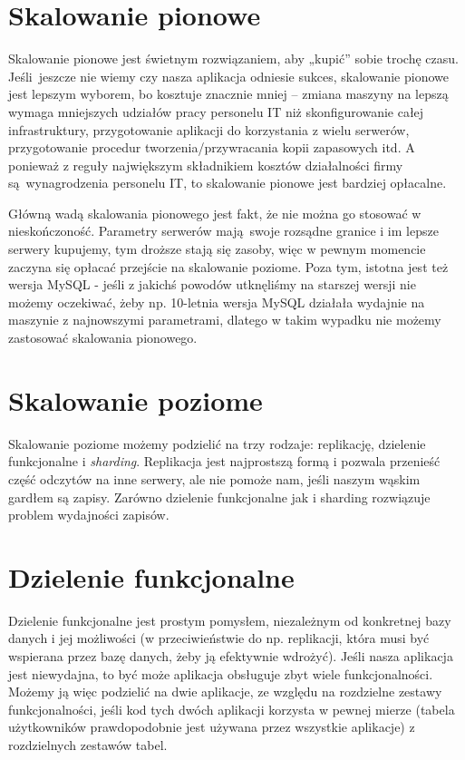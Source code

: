 \documentclass[a4paper,12pt]{article}
\begin{document}
\section{Skalowanie pionowe}

Skalowanie pionowe jest świetnym rozwiązaniem, aby „kupić” sobie trochę czasu. Jeśli~jeszcze nie wiemy czy nasza aplikacja odniesie sukces, skalowanie pionowe jest lepszym wyborem, bo kosztuje znacznie mniej – zmiana maszyny na lepszą wymaga mniejszych udziałów pracy personelu IT niż skonfigurowanie całej infrastruktury, przygotowanie aplikacji do korzystania z wielu serwerów, przygotowanie procedur tworzenia/przywracania kopii zapasowych itd. A ponieważ z reguły największym składnikiem kosztów działalności firmy są wynagrodzenia personelu IT, to skalowanie pionowe jest bardziej opłacalne.

Główną wadą skalowania pionowego jest fakt, że nie można go stosować w nieskończoność. Parametry serwerów mają swoje rozsądne granice i im lepsze serwery kupujemy, tym droższe stają się zasoby, więc w pewnym momencie zaczyna się opłacać przejście na skalowanie poziome. Poza tym, istotna jest też wersja MySQL - jeśli z jakichś powodów utknęliśmy na starszej wersji nie możemy oczekiwać, żeby np. 10-letnia wersja MySQL działała wydajnie na maszynie z najnowszymi parametrami, dlatego w takim wypadku nie możemy zastosować skalowania pionowego.

\section{Skalowanie poziome}

Skalowanie poziome możemy podzielić na trzy rodzaje: replikację, dzielenie funkcjonalne i \textit{sharding}. Replikacja jest najprostszą formą i pozwala przenieść część odczytów na inne serwery, ale nie pomoże nam, jeśli naszym wąskim gardłem są zapisy. Zarówno dzielenie funkcjonalne jak i sharding rozwiązuje problem wydajności zapisów.

\section{Dzielenie funkcjonalne}

Dzielenie funkcjonalne jest prostym pomysłem, niezależnym od konkretnej bazy danych i jej możliwości (w przeciwieństwie do np. replikacji, która musi być wspierana przez bazę danych, żeby ją efektywnie wdrożyć). Jeśli nasza aplikacja jest niewydajna, to być może aplikacja obsługuje zbyt wiele funkcjonalności. Możemy ją więc podzielić na dwie aplikacje, ze względu na rozdzielne zestawy funkcjonalności, jeśli kod tych dwóch aplikacji korzysta w pewnej mierze (tabela użytkowników prawdopodobnie jest używana przez wszystkie aplikacje) z rozdzielnych zestawów tabel.
\end{document}
